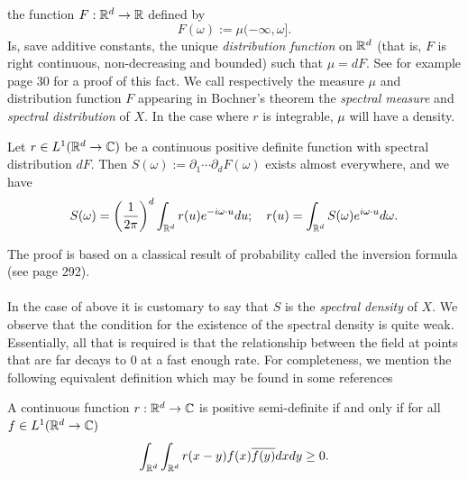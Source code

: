 \documentclass[
    a4paper,
    DIV=14,
    abstract=true,
    numbers=noenddot
]{scrartcl}
\begin{document}
the function $F:\mathbb{R}^d\to \mathbb{R}$ defined by
\begin{equation*}
	F(\omega):= \mu (-\infty,\omega].
\end{equation*}
Is, save additive constants, the unique \emph{distribution function} on $\mathbb{R}^d$ (that is,  $F$ is right continuous, non-decreasing and bounded) such that $\mu =dF$. See for example \cite{ash2000probability} page $30$ for a proof of this fact. We call respectively the measure $\mu$ and distribution function $F$ appearing in Bochner's theorem  the \emph{spectral measure} and \emph{spectral distribution} of $X$. In the case where $r$ is integrable, $\mu$ will have a density.
\begin{proposition}\label{Fourier inversion}
	Let $r\in L^1(\mathbb{R}^d\to\mathbb{C})$ be a continuous positive definite function with spectral distribution $dF$. Then
	$S(\omega):=\partial_1\cdots\partial_d F(\omega)$ exists almost everywhere, and we have
	\begin{equation*}
		S(\omega)=\qty(\frac{1}{2\pi})^d\int_{\mathbb{R}^d} {r}(u)e^{-i\omega\cdot u} d u;\quad    r(u)=\int_{\mathbb{R}^d}S(\omega)e^{i \omega\cdot u} d\omega.
	\end{equation*}
\end{proposition}
The proof is based on a classical result of probability called the inversion formula (see \cite{ash2000probability} page 292).\\
\\
In the case of  above it is customary to say that $S$ is the \emph{spectral density} of $X$. We observe that the condition for the existence of the spectral density is quite weak. Essentially, all that is required is that the relationship between the field at points that are far decays to $0$ at a fast enough rate. For completeness, we mention the following equivalent definition which may be found in some references
\begin{lemma}
	A continuous function $r:\mathbb{R}^d\to\mathbb{C}$ is positive semi-definite if and only if for all $f\in L^1(\mathbb{R}^d\to\mathbb{C})$
	\begin{equation*}
		\int_{\mathbb{R}^d}\int_{\mathbb{R}^d} r(x-y)f(x)\overline{f(y)}dx dy \geq 0.
	\end{equation*}
\end{lemma}
\end{document}
